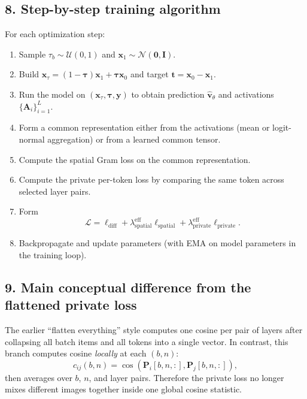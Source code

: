 \documentclass[11pt]{article}
\begin{document}
\subsection*{8. Step-by-step training algorithm}
For each optimization step:
\begin{enumerate}
  \item Sample $\tau_b\sim\mathcal{U}(0,1)$ and $\bm{x}_1\sim\mathcal{N}(\bm{0},\bm{I})$.
  \item Build $\bm{x}_\tau=(1-\bm{\tau})\bm{x}_1+\bm{\tau}\bm{x}_0$ and target $\bm{t}=\bm{x}_0-\bm{x}_1$.
  \item Run the model on $(\bm{x}_\tau,\bm{\tau},\bm{y})$ to obtain prediction $\hat{\bm{v}}_\theta$ and activations $\{\bm{A}_i\}_{i=1}^L$.
  \item Form a common representation either from the activations (mean or logit-normal aggregation) or from a learned common tensor.
  \item Compute the spatial Gram loss on the common representation.
  \item Compute the private per-token loss by comparing the same token across selected layer pairs.
  \item Form
  \[
    \mathcal{L}
    =
    \ell_{\mathrm{diff}}
    +
    \lambda_{\mathrm{spatial}}^{\mathrm{eff}} \ell_{\mathrm{spatial}}
    +
    \lambda_{\mathrm{private}}^{\mathrm{eff}} \ell_{\mathrm{private}}.
  \]
  \item Backpropagate and update parameters (with EMA on model parameters in the training loop).
\end{enumerate}

\subsection*{9. Main conceptual difference from the flattened private loss}
The earlier ``flatten everything'' style computes one cosine per pair of layers after collapsing all batch items and all tokens into a single vector. In contrast, this branch computes cosine \emph{locally} at each $(b,n)$:
\[
  c_{ij}(b,n)=\cos(\bm{P}_i[b,n,:], \bm{P}_j[b,n,:]),
\]
then averages over $b$, $n$, and layer pairs. Therefore the private loss no longer mixes different images together inside one global cosine statistic.
\end{document}
